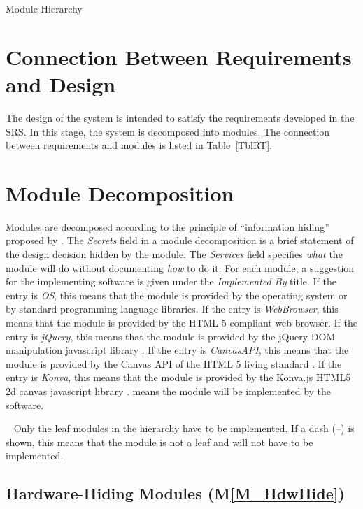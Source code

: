 \documentclass[12pt, titlepage]{article}
\newcommand{\mref}[1]{M\ref{#1}}
\begin{document}
\begin{table}[h!]
\centering

\caption{Module Hierarchy}
\label{TblMH}
\end{table}

\section{Connection Between Requirements and Design} \label{SecConnection}

The design of the system is intended to satisfy the requirements developed in
the SRS. In this stage, the system is decomposed into modules. The connection
between requirements and modules is listed in Table~\ref{TblRT}.

\section{Module Decomposition} \label{SecMD}

Modules are decomposed according to the principle of ``information hiding''
proposed by \citet{ParnasEtAl1984}. The \emph{Secrets} field in a module
decomposition is a brief statement of the design decision hidden by the
module. The \emph{Services} field specifies \emph{what} the module will do
without documenting \emph{how} to do it. For each module, a suggestion for the
implementing software is given under the \emph{Implemented By} title. If the
entry is \emph{OS}, this means that the module is provided by the operating
system or by standard programming language libraries.
If the entry is \emph{WebBrowser}, this means that the module is provided by the 
HTML 5 \cite{html5} compliant web browser.
If the entry is \emph{jQuery}, this means that the module is provided by the 
jQuery DOM \cite{html_DOM} manipulation javascript library \cite{jquery}.
If the entry is \emph{CanvasAPI}, this means that the module is provided by the 
Canvas API of the HTML 5 living standard \cite{html_std_canvas}.
If the entry is \emph{Konva}, this means that the module is provided by the 
Konva.js HTML5 2d canvas javascript library \cite{konva_2021}.
\emph{\progname{}} means the module will be implemented by the \progname{} software.

~\newline
Only the leaf modules in the hierarchy have to be implemented. If a dash
(\emph{--}) is shown, this means that the module is not a leaf and will not have
to be implemented.

\subsection{Hardware-Hiding Modules (\mref{M_HdwHide})}
\end{document}
